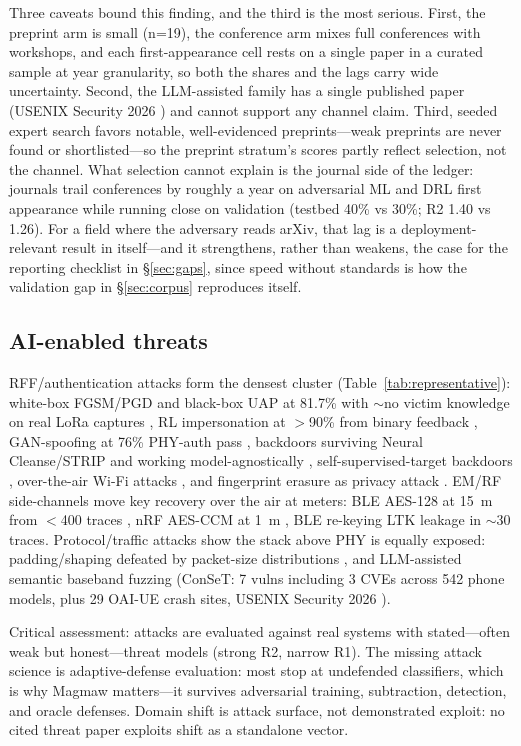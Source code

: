 \documentclass[10.5pt,compsoc,winfonts]{ICN}
\newcommand{\upcite}[1]{\cite{#1}}
\begin{document}
Three caveats bound this finding, and the third is the most serious. First, the preprint arm is small (n=19), the conference arm mixes full conferences with workshops, and each first-appearance cell rests on a single paper in a curated sample at year granularity, so both the shares and the lags carry wide uncertainty. Second, the LLM-assisted family has a single published paper (USENIX Security 2026 \upcite{T28}) and cannot support any channel claim. Third, seeded expert search favors notable, well-evidenced preprints—weak preprints are never found or shortlisted—so the preprint stratum's scores partly reflect selection, not the channel. What selection cannot explain is the journal side of the ledger: journals trail conferences by roughly a year on adversarial ML and DRL first appearance while running close on validation (testbed 40\% vs 30\%; R2 1.40 vs 1.26). For a field where the adversary reads arXiv, that lag is a deployment-relevant result in itself—and it strengthens, rather than weakens, the case for the reporting checklist in \S\ref{sec:gaps}, since speed without standards is how the validation gap in \S\ref{sec:corpus} reproduces itself.

\subsection{AI-enabled threats}
\label{sec:threat}
RFF/authentication attacks form the densest cluster (Table~\ref{tab:representative}): white-box FGSM/PGD and black-box UAP at 81.7\% with $\sim$no victim knowledge on real LoRa captures \upcite{T03}, RL impersonation at $>$90\% from binary feedback \upcite{T18}, GAN-spoofing at 76\% PHY-auth pass \upcite{T09}, backdoors surviving Neural Cleanse/STRIP \upcite{T12} and working model-agnostically \upcite{T16}, self-supervised-target backdoors \upcite{T41}, over-the-air Wi-Fi attacks \upcite{T42}, and fingerprint erasure as privacy attack \upcite{T06}. EM/RF side-channels move key recovery over the air at meters: BLE AES-128 at 15~m from $<$400 traces \upcite{T01}, nRF AES-CCM at 1~m \upcite{T08}, BLE re-keying LTK leakage in $\sim$30 traces. Protocol/traffic attacks show the stack above PHY is equally exposed: padding/shaping defeated by packet-size distributions \upcite{T19}, and LLM-assisted semantic baseband fuzzing (ConSeT: 7 vulns including 3 CVEs across 542 phone models, plus 29 OAI-UE crash sites, USENIX Security 2026 \upcite{T28}).

Critical assessment: attacks are evaluated against real systems with stated—often weak but honest—threat models (strong R2, narrow R1). The missing attack science is adaptive-defense evaluation: most stop at undefended classifiers, which is why Magmaw \upcite{T30} matters—it survives adversarial training, subtraction, detection, and oracle defenses. Domain shift is attack surface, not demonstrated exploit: no cited threat paper exploits shift as a standalone vector.
\end{document}
